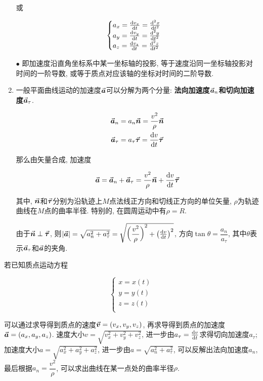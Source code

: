 \begin{enumerate}
	或
	
	\begin{equation}
		\begin{cases}
			a_x = \dv{v_x}{t} = \dv[2]{x}{t} \\
			a_y = \dv{v_y}{t} = \dv[2]{y}{t} \\
			a_z = \dv{v_z}{t} = \dv[2]{z}{t}
		\end{cases}
	    \label{C1-eq16}
	\end{equation}
	
	$\bullet$ 即加速度沿直角坐标系中某一坐标轴的投影, 等于速度沿同一坐标轴投影对时间的一阶导数, 或等于质点对应该轴的坐标对时间的二阶导数. 
	
	\item 一般平面曲线运动的加速度$\va*{a}$可以分解为两个分量: \textbf{法向加速度$\va*{a}_n$和切向加速度$\va*{a}_{\tau}$}. 
	
	\begin{align}
		\va*{a}_n &= a_n \va*{n} = \dfrac{v^2}{\rho} \va*{n} \label{C1-eq17} \\
		\va*{a}_{\tau} &= a_{\tau} \va*{\tau} = \dv{v}{t} \va*{\tau} \label{C1-eq18}
	\end{align}
	
	那么由矢量合成, 加速度
	
	\begin{equation}
		\va*{a} = \va*{a}_n + \va*{a}_{\tau} = \dfrac{v^2}{\rho} \va*{n} + \dv{v}{t} \va*{\tau} \label{C1-eq19}
	\end{equation}
	
	其中, $\va*{n}$和$\va*{\tau}$分别为沿轨迹上$M$点法线正方向和切线正方向的单位矢量, $\rho$为轨迹曲线在$M$点的曲率半径. 特别的, 在圆周运动中有$\rho = R$. 
	
	\vskip 0.3cm
	
	由于$\va*{n} \perp \va*{\tau}$, 则$\abs{\va*{a}} = \sqrt{a_n^2 + a_{\tau}^2} = \sqrt{\qty(\dfrac{v^2}{\rho})^2 + \qty(\dv{v}{t})^2}$, 方向$\tan \theta = \dfrac{a_n}{a_{\tau}}$, 其中$\theta$表示$\va*{a}_{\tau}$和$\va*{a}$的夹角. 
	
\end{enumerate}

\begin{note}
	
	若已知质点运动方程
	
	\begin{equation*}
		\begin{cases}
			x = x(t) \\
			y = y(t) \\
			z = z(t) \\
		\end{cases}
	\end{equation*}
	
	可以通过求导得到质点的速度$\va*{v} = (v_x, v_y, v_z)$, 再求导得到质点的加速度$\va*{a} = (a_x, a_y, a_z)$. 速度大小$v = \sqrt{v_x^2 + v_y^2 + v_z^2}$, 进一步由$a_{\tau} = \dv{v}{t}$求得切向加速度$a_{\tau}$; 加速度大小$a = \sqrt{a_x^2 + a_y^2 + a_z^2}$, 进一步由$a = \sqrt{a_n^2 + a_{\tau}^2}$, 可以反解出法向加速度$a_n$, 最后根据$a_n = \dfrac{v^2}{\rho}$, 可以求出曲线在某一点处的曲率半径$\rho$. 
	
\end{note}

